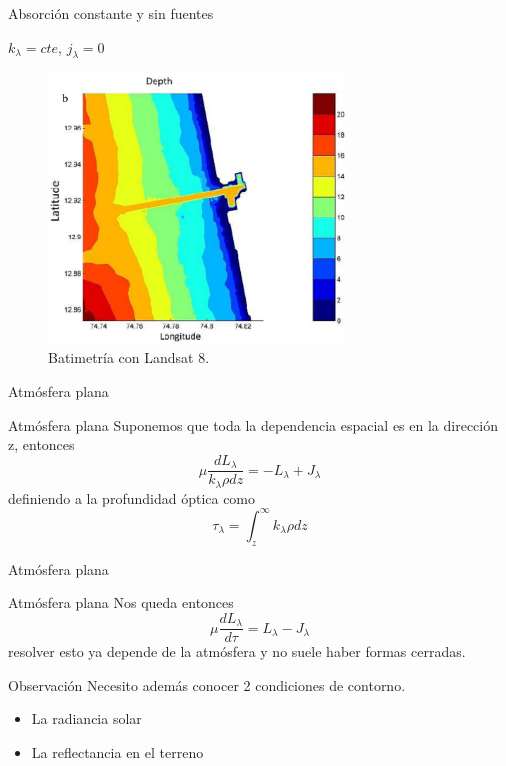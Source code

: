 \documentclass[handout]{beamer}
\begin{document}
\begin{frame}{Absorción constante y sin fuentes}
  \begin{exampleblock}{$k_\lambda = cte$, $j_\lambda = 0$}
    \begin{figure}
    \centering
    \includegraphics[width=0.7\textwidth]{imagenes/bati.png}
      \caption{Batimetría con Landsat 8.}
    \end{figure}
  \end{exampleblock}
\end{frame}

\begin{frame}{Atmósfera plana}
  \begin{exampleblock}{Atmósfera plana}
    Suponemos que toda la dependencia espacial es en la dirección z, entonces
    \begin{equation}
      \mu \frac{dL_\lambda}{k_\lambda \rho dz} = -L_\lambda + J_\lambda
    \end{equation} \pause
    definiendo a la profundidad óptica como
    \begin{equation}
        \tau_\lambda = \int_z^\infty k_\lambda \rho dz
    \end{equation}
  \end{exampleblock}
\end{frame}

\begin{frame}{Atmósfera plana}
  \begin{exampleblock}{Atmósfera plana}
    Nos queda entonces
    \begin{equation}
      \mu \frac{dL_\lambda}{d\tau} = L_\lambda - J_\lambda
    \end{equation}\pause
    resolver esto ya depende de la atmósfera y no suele haber formas cerradas.
  \end{exampleblock}
  \pause
  \begin{alertblock}{Observación}
    Necesito además conocer 2 condiciones de contorno.
    \begin{itemize}[<+->]
      \item La radiancia solar
      \item La reflectancia en el terreno
    \end{itemize}
  \end{alertblock}
\end{frame}
\end{document}
